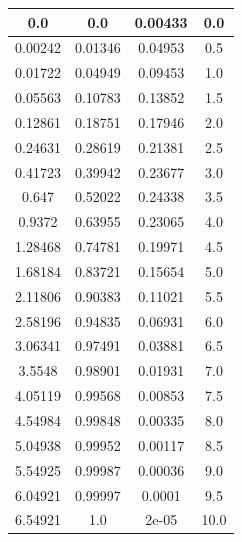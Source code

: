 \begin{table}
{\begin{tabular}{|c|c|c|c|}
            0.0 & 0.0 & 0.00433 & 0.0 \\ \hline
            0.00242 & 0.01346 & 0.04953 & 0.5 \\ \hline
            0.01722 & 0.04949 & 0.09453 & 1.0 \\ \hline
            0.05563 & 0.10783 & 0.13852 & 1.5 \\ \hline
            0.12861 & 0.18751 & 0.17946 & 2.0 \\ \hline
            0.24631 & 0.28619 & 0.21381 & 2.5 \\ \hline
            0.41723 & 0.39942 & 0.23677 & 3.0 \\ \hline
            0.647 & 0.52022 & 0.24338 & 3.5 \\ \hline
            0.9372 & 0.63955 & 0.23065 & 4.0 \\ \hline
            1.28468 & 0.74781 & 0.19971 & 4.5 \\ \hline
            1.68184 & 0.83721 & 0.15654 & 5.0 \\ \hline
            2.11806 & 0.90383 & 0.11021 & 5.5 \\ \hline
            2.58196 & 0.94835 & 0.06931 & 6.0 \\ \hline
            3.06341 & 0.97491 & 0.03881 & 6.5 \\ \hline
            3.5548 & 0.98901 & 0.01931 & 7.0 \\ \hline
            4.05119 & 0.99568 & 0.00853 & 7.5 \\ \hline
            4.54984 & 0.99848 & 0.00335 & 8.0 \\ \hline
            5.04938 & 0.99952 & 0.00117 & 8.5 \\ \hline
            5.54925 & 0.99987 & 0.00036 & 9.0 \\ \hline
            6.04921 & 0.99997 & 0.0001 & 9.5 \\ \hline
            6.54921 & 1.0 & 2e-05 & 10.0 \\ \hline
        \end{tabular}
        \label{table_m8}
    }
\end{table}


